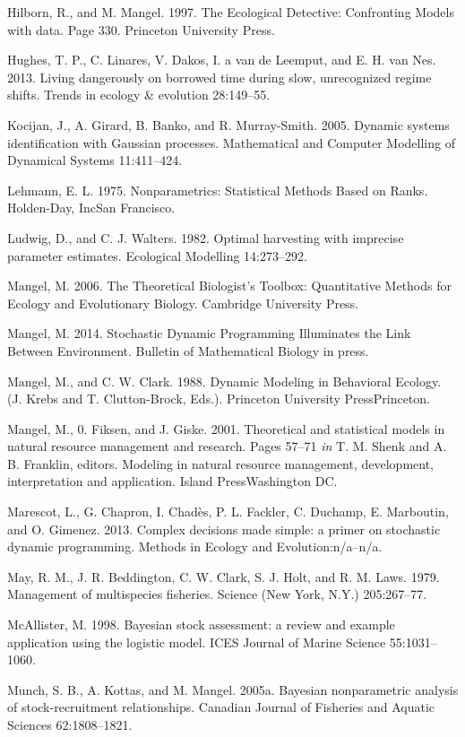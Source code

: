 \documentclass[author-year, 12pt,review]{components/elsarticle} %
\begin{document}
Hilborn, R., and M. Mangel. 1997. The Ecological Detective: Confronting
Models with data. Page 330. Princeton University Press.

Hughes, T. P., C. Linares, V. Dakos, I. a van de Leemput, and E. H. van
Nes. 2013. Living dangerously on borrowed time during slow, unrecognized
regime shifts. Trends in ecology \& evolution 28:149--55.

Kocijan, J., A. Girard, B. Banko, and R. Murray-Smith. 2005. Dynamic
systems identification with Gaussian processes. Mathematical and
Computer Modelling of Dynamical Systems 11:411--424.

Lehmann, E. L. 1975. Nonparametrics: Statistical Methods Based on Ranks.
Holden-Day, IncSan Francisco.

Ludwig, D., and C. J. Walters. 1982. Optimal harvesting with imprecise
parameter estimates. Ecological Modelling 14:273--292.

Mangel, M. 2006. The Theoretical Biologist's Toolbox: Quantitative
Methods for Ecology and Evolutionary Biology. Cambridge University
Press.

Mangel, M. 2014. Stochastic Dynamic Programming Illuminates the Link
Between Environment. Bulletin of Mathematical Biology in press.

Mangel, M., and C. W. Clark. 1988. Dynamic Modeling in Behavioral
Ecology. (J. Krebs and T. Clutton-Brock, Eds.). Princeton University
PressPrinceton.

Mangel, M., 0. Fiksen, and J. Giske. 2001. Theoretical and statistical
models in natural resource management and research. Pages 57--71
\emph{in} T. M. Shenk and A. B. Franklin, editors. Modeling in natural
resource management, development, interpretation and application. Island
PressWashington DC.

Marescot, L., G. Chapron, I. Chadès, P. L. Fackler, C. Duchamp, E.
Marboutin, and O. Gimenez. 2013. Complex decisions made simple: a primer
on stochastic dynamic programming. Methods in Ecology and
Evolution:n/a--n/a.

May, R. M., J. R. Beddington, C. W. Clark, S. J. Holt, and R. M. Laws.
1979. Management of multispecies fisheries. Science (New York, N.Y.)
205:267--77.

McAllister, M. 1998. Bayesian stock assessment: a review and example
application using the logistic model. ICES Journal of Marine Science
55:1031--1060.

Munch, S. B., A. Kottas, and M. Mangel. 2005a. Bayesian nonparametric
analysis of stock-recruitment relationships. Canadian Journal of
Fisheries and Aquatic Sciences 62:1808--1821.
\end{document}
